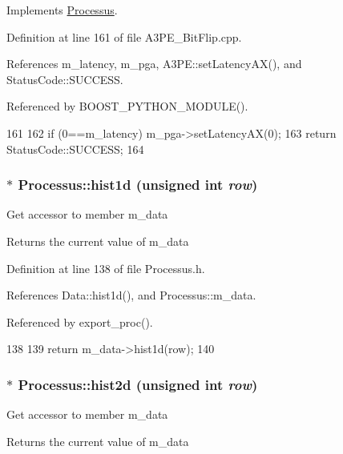 Implements \hyperlink{classProcessus_aba93d691f031bdb18ae4b8afb1b2e856}{Processus}.

Definition at line 161 of file A3PE\_\-BitFlip.cpp.

References m\_\-latency, m\_\-pga, A3PE::setLatencyAX(), and StatusCode::SUCCESS.

Referenced by BOOST\_\-PYTHON\_\-MODULE().


\begin{DoxyCode}
161                                     {
162   if (0==m_latency) m_pga->setLatencyAX(0);
163   return StatusCode::SUCCESS;
164 }
\end{DoxyCode}
\hypertarget{classProcessus_a409227db936baff03c0462c1bcfe8069}{
\subsubsection[{hist1d}]{$\ast$ Processus::hist1d (unsigned int {\em row})}}
\label{classProcessus_a409227db936baff03c0462c1bcfe8069}
Get accessor to member m\_\-data \begin{DoxyReturn}{Returns}
the current value of m\_\-data 
\end{DoxyReturn}


Definition at line 138 of file Processus.h.

References Data::hist1d(), and Processus::m\_\-data.

Referenced by export\_\-proc().


\begin{DoxyCode}
138                                    {
139     return m_data->hist1d(row);
140   }
\end{DoxyCode}
\hypertarget{classProcessus_a73b5118cb5f2b5eaad33286183b86cfc}{
\subsubsection[{hist2d}]{$\ast$ Processus::hist2d (unsigned int {\em row})}}
\label{classProcessus_a73b5118cb5f2b5eaad33286183b86cfc}
Get accessor to member m\_\-data \begin{DoxyReturn}{Returns}
the current value of m\_\-data 
\end{DoxyReturn}


